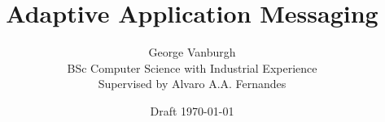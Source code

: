 \documentclass[a4paper,12pt,titlepage]{article}
\title{Adaptive Application Messaging}
\author{George Vanburgh\\
        BSc Computer Science with Industrial Experience\\
        Supervised by Alvaro A.A. Fernandes}
\date{Draft \today}
\begin{document}
  

  \maketitle

  \begin{abstract}

  \end{abstract}

  \tableofcontents
  \begin{versionhistory}
  \end{versionhistory}
  \newpage

  

  \printglossaries
\end{document}
